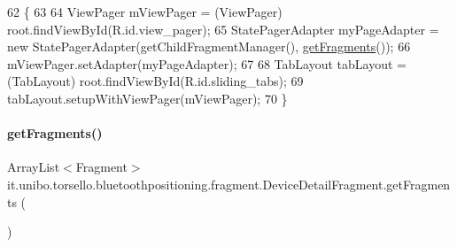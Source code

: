 \begin{DoxyCode}
62                                              \{
63 
64         ViewPager mViewPager = (ViewPager) root.findViewById(R.id.view\_pager);
65         StatePagerAdapter myPageAdapter = \textcolor{keyword}{new} StatePagerAdapter(getChildFragmentManager(), 
      \hyperlink{classit_1_1unibo_1_1torsello_1_1bluetoothpositioning_1_1fragment_1_1DeviceDetailFragment_a98e370cfcbfe5eaa4e1fe9242b00e639_a98e370cfcbfe5eaa4e1fe9242b00e639}{getFragments}());
66         mViewPager.setAdapter(myPageAdapter);
67 
68         TabLayout tabLayout = (TabLayout) root.findViewById(R.id.sliding\_tabs);
69         tabLayout.setupWithViewPager(mViewPager);
70     \}
\end{DoxyCode}
\hypertarget{classit_1_1unibo_1_1torsello_1_1bluetoothpositioning_1_1fragment_1_1DeviceDetailFragment_a98e370cfcbfe5eaa4e1fe9242b00e639_a98e370cfcbfe5eaa4e1fe9242b00e639}{}\label{classit_1_1unibo_1_1torsello_1_1bluetoothpositioning_1_1fragment_1_1DeviceDetailFragment_a98e370cfcbfe5eaa4e1fe9242b00e639_a98e370cfcbfe5eaa4e1fe9242b00e639} 
\paragraph{\texorpdfstring{get\+Fragments()}{getFragments()}}
{\footnotesize\ttfamily Array\+List$<$Fragment$>$ it.\+unibo.\+torsello.\+bluetoothpositioning.\+fragment.\+Device\+Detail\+Fragment.\+get\+Fragments (\begin{DoxyParamCaption}{ }\end{DoxyParamCaption})\hspace{0.3cm}{\ttfamily [private]}}


